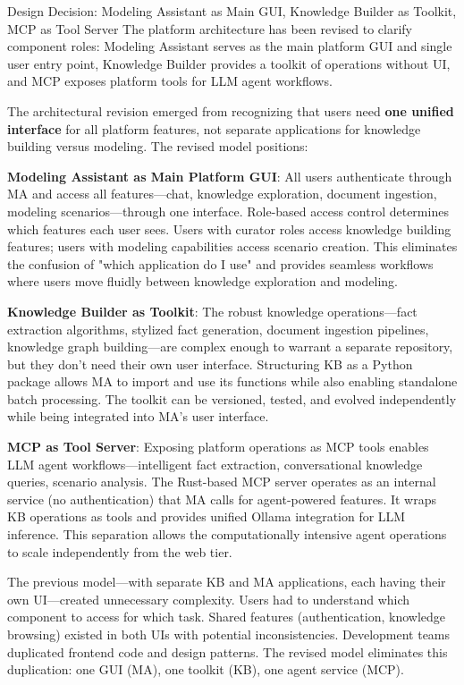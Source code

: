 \documentclass[12pt,a4paper]{article}
\begin{document}
\begin{rationale}{Design Decision: Modeling Assistant as Main GUI, Knowledge Builder as Toolkit, MCP as Tool Server}
The platform architecture has been revised to clarify component roles: Modeling Assistant serves as the main platform GUI and single user entry point, Knowledge Builder provides a toolkit of operations without UI, and MCP exposes platform tools for LLM agent workflows.
\end{rationale}

The architectural revision emerged from recognizing that users need \textbf{one unified interface} for all platform features, not separate applications for knowledge building versus modeling. The revised model positions:

\textbf{Modeling Assistant as Main Platform GUI}: All users authenticate through MA and access all features—chat, knowledge exploration, document ingestion, modeling scenarios—through one interface. Role-based access control determines which features each user sees. Users with curator roles access knowledge building features; users with modeling capabilities access scenario creation. This eliminates the confusion of "which application do I use" and provides seamless workflows where users move fluidly between knowledge exploration and modeling.

\textbf{Knowledge Builder as Toolkit}: The robust knowledge operations—fact extraction algorithms, stylized fact generation, document ingestion pipelines, knowledge graph building—are complex enough to warrant a separate repository, but they don't need their own user interface. Structuring KB as a Python package allows MA to import and use its functions while also enabling standalone batch processing. The toolkit can be versioned, tested, and evolved independently while being integrated into MA's user interface.

\textbf{MCP as Tool Server}: Exposing platform operations as MCP tools enables LLM agent workflows—intelligent fact extraction, conversational knowledge queries, scenario analysis. The Rust-based MCP server operates as an internal service (no authentication) that MA calls for agent-powered features. It wraps KB operations as tools and provides unified Ollama integration for LLM inference. This separation allows the computationally intensive agent operations to scale independently from the web tier.

The previous model—with separate KB and MA applications, each having their own UI—created unnecessary complexity. Users had to understand which component to access for which task. Shared features (authentication, knowledge browsing) existed in both UIs with potential inconsistencies. Development teams duplicated frontend code and design patterns. The revised model eliminates this duplication: one GUI (MA), one toolkit (KB), one agent service (MCP).
\end{document}
